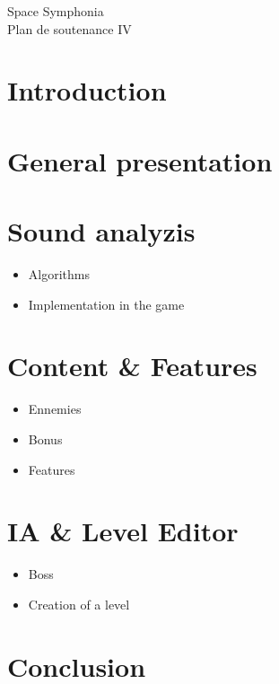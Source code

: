 \documentclass[12pt,a4paper]{article}
\title{}
\author{}
\date{}
\begin{document}
	\begin{center}
		\Huge{Space Symphonia} \\
		\Large{Plan de soutenance IV}
	\end{center}
	\vspace{2cm}
	\section{Introduction}
	\section{General presentation}
	\section{Sound analyzis}
		\begin{itemize}
			\item Algorithms
			\item Implementation in the game
		\end{itemize}
	\section{Content & Features}
		\begin{itemize}
			\item Ennemies
			\item Bonus
			\item Features
		\end{itemize}
	\section{IA & Level Editor}
		\begin{itemize}
			\item Boss
			\item Creation of a level
		\end{itemize}
	\section{Conclusion}
\end{document}
